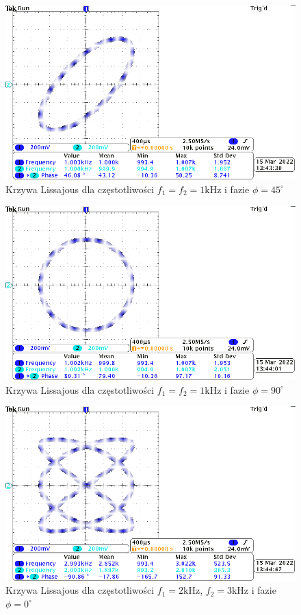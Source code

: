 \documentclass[11pt]{extarticle}
\begin{document}
	\begin{figure}[htp]
		\centering
		\includegraphics[width=\textwidth]{include/2/4.png}
		\caption{Krzywa Lissajous dla częstotliwości \(f_1=f_2=1\text{kHz}\) i fazie \(\phi=45^{\circ}\)}
	\end{figure}

	\begin{figure}[htp]
		\centering
		\includegraphics[width=\textwidth]{include/2/5.png}
		\caption{Krzywa Lissajous dla częstotliwości \(f_1=f_2=1\text{kHz}\) i fazie \(\phi=90^{\circ}\)}
	\end{figure}

	\begin{figure}[htp]
		\centering
		\includegraphics[width=\textwidth]{include/2/6.png}
		\caption{Krzywa Lissajous dla częstotliwości \(f_1=2\text{kHz}\), \(f_2=3\text{kHz}\) i fazie \(\phi=0^{\circ}\)}
	\end{figure}
\end{document}
